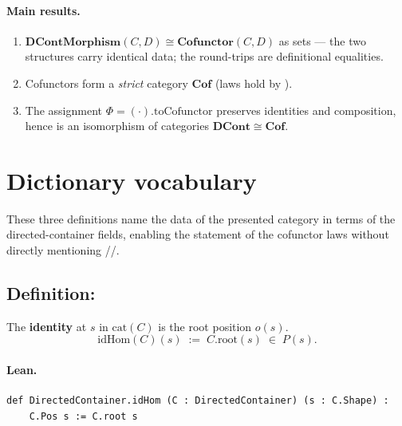 \documentclass[11pt,a4paper]{article}
\begin{document}
\paragraph{Main results.}
\begin{enumerate}
  \item $\mathbf{DContMorphism}(C,D) \cong \mathbf{Cofunctor}(C,D)$ as sets ---
        the two structures carry identical data; the round-trips are
        definitional equalities.
  \item Cofunctors form a \emph{strict} category $\mathbf{Cof}$ (laws hold by
        ).
  \item The assignment $\Phi = ({\cdot}).\mathrm{toCofunctor}$ preserves
        identities and composition, hence is an isomorphism of categories
        $\mathbf{DCont} \cong \mathbf{Cof}$.
\end{enumerate}


\section{Dictionary vocabulary}

These three definitions name the data of the presented category in terms of the
directed-container fields, enabling the statement of the cofunctor laws without
directly mentioning //.

\subsection{Definition: }

\begin{defn}
The \textbf{identity} at $s$ in $\mathrm{cat}(C)$ is the root position $o(s)$.
\[
  \mathrm{idHom}(C)(s) \;:=\; C.\mathrm{root}(s) \;\in\; P(s).
\]
\end{defn}

\paragraph{Lean.}
\begin{lstlisting}[style=lean]
def DirectedContainer.idHom (C : DirectedContainer) (s : C.Shape) :
    C.Pos s := C.root s
\end{lstlisting}
\end{document}
